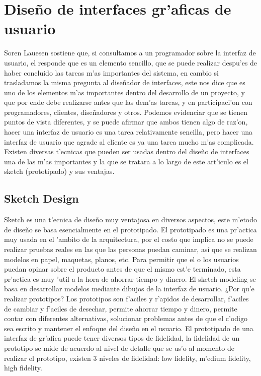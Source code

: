 \section{Dise\~no de interfaces gr'aficas de usuario}
Soren Lauesen sostiene que, si consultamos a un programador sobre la interfaz de usuario, el responde que es un elemento sencillo, que se puede realizar despu'es de haber concluido las tareas m'as importantes del sistema, en cambio si trasladamos la misma pregunta al dise\~nador de interfaces, este nos dice que es uno de los elementos m'as importantes dentro del desarrollo de un proyecto, y que por ende debe realizarse antes que las dem'as tareas, y en participaci'on con programadores, clientes, dise\~nadores y otros.
Podemos evidenciar que se tienen puntos de vista diferentes, y se puede afirmar que ambos tienen algo de raz'on, hacer una interfaz de usuario es una tarea relativamente sencilla, pero hacer una interfaz de usuario que agrade al cliente es ya una tarea mucho m'as complicada.
Existen diversas t'ecnicas que pueden ser usadas dentro del dise\~no de interfaces una de las m'as importantes y la que se tratara a lo largo de este art'iculo es el sketch (prototipado) y sus ventajas.

\subsection{Sketch Design}

Sketch es una t'ecnica de dise\~no muy ventajosa en diversos aspectos, este m'etodo de dise\~no se basa esencialmente en el prototipado.
	El prototipado es una pr'actica muy usada en el 'ambito de la arquitectura, por el costo que implica no se puede realizar pruebas reales en las que las personas puedan caminar, así que se realizan modelos en papel, maquetas, planos, etc. Para permitir que el o los usuarios puedan opinar sobre el producto antes de que  el mismo est'e terminado, esta pr'actica es muy 'util a la hora de ahorrar tiempo y dinero. El sketch modeling se basa en desarrollar modelos mediante dibujos de la interfaz de usuario.
¿Por qu'e realizar prototipos?
Los prototipos son f'aciles y r'apidos de desarrollar, f'aciles de cambiar y f'aciles de desechar, permite ahorrar tiempo y dinero, permite contar con diferentes alternativas, solucionar problemas antes de que el c'odigo sea escrito y mantener el enfoque del dise\~no en el usuario.
El prototipado de una interfaz de gr'afica puede tener diversos tipos de fidelidad, la fidelidad de un prototipo se mide de acuerdo al nivel de detalle que se us'o al momento de realizar el prototipo, existen 3 niveles de fidelidad: low fidelity, m'edium fidelity, high fidelity. 

